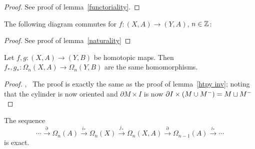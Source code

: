 \documentclass[a4paper,11pt]{article}
\begin{document}
\begin{proof}
    See proof of lemma\ \ref{functoriality}.
\end{proof}

\begin{lemma}
    The following diagram commutes for \(f:(X,A)\to(Y,A)\), \(n\in\mathbb{Z}\):
    \begin{center}
    \end{center}
\end{lemma}

\begin{proof}
    See proof of lemma\ \ref{naturality}
\end{proof}

\begin{lemma}
    Let \(f,g:(X,A)\to(Y,B)\) be homotopic maps. Then \(f_\ast,g_\ast:\Omega_n(X,A)\to\Omega_n(Y,B)\) are the same homomorphisms.
\end{lemma}

\begin{proof}\cite{atiyah},\ \cite{conner}
    The proof is exactly the same as the proof of lemma\ \ref{htpy inv}; noting that the cylinder is now oriented and \(\partial M\times I\) is now \(\partial I\times (M\cup M^-)=M\sqcup M^-\)%
\end{proof}

\begin{lemma}
    The sequence
    \[\cdots\xrightarrow{\partial}\Omega_n(A)\xrightarrow{i_\ast}\Omega_n(X)\xrightarrow{j_\ast}\Omega_n(X,A)\xrightarrow{\partial}\Omega_{n-1}(A)\xrightarrow{i_\ast}\cdots\]
    is exact.
\end{lemma}
\end{document}
